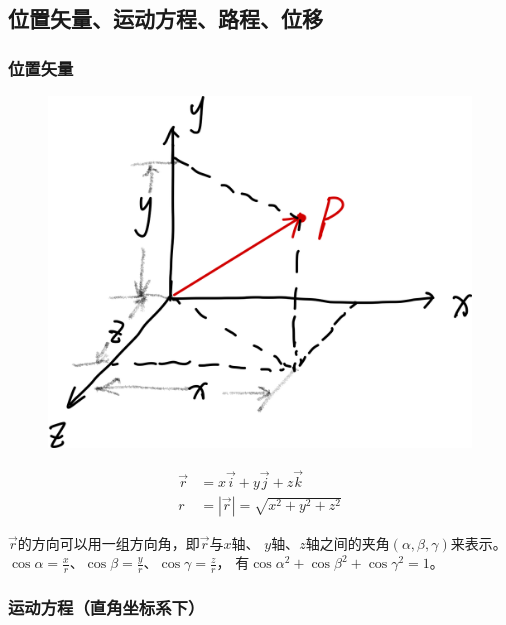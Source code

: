 \documentclass[
	12pt, %
	fleqn, %
	a4paper, %
]{myLegrandOrangeBook}
\begin{document}
\subsection{位置矢量、运动方程、路程、位移}

\subsubsection*{位置矢量}

    \begin{figure}
        \centering
        \includegraphics[scale=0.08]{"Chapter 01 images/pic1.png"}
        \label{pic1}
    \end{figure}

    \begin{align}
        \overrightarrow{r} &= x\overrightarrow{i} + y\overrightarrow{j} + z\overrightarrow{k} \\
        r &= \left|\overrightarrow{r}\right| = \sqrt{x^2 + y^2 + z^2}
    \end{align}

    \(\overrightarrow{r}\)的方向可以用一组方向角，即\(\overrightarrow{r}\)与\(x\)轴、
    \(y\)轴、\(z\)轴之间的夹角\(\left(\alpha, \beta, \gamma\right)\)来表示。
    \(\cos \alpha = \frac{x}{r}\)、\(\cos \beta = \frac{y}{r}\)、\(\cos \gamma = \frac{z}{r}\)，
    有\(\cos \alpha ^2 + \cos \beta ^2 + \cos \gamma ^2 = 1\)。

\subsubsection*{运动方程（直角坐标系下）}
    
\end{document}
